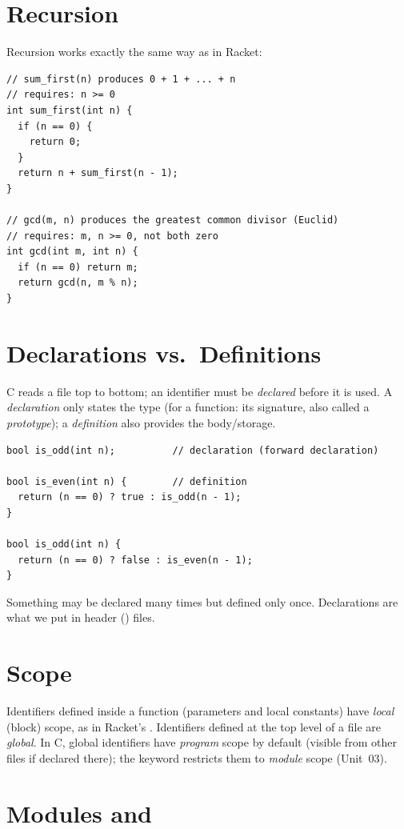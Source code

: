 \section{Recursion}

Recursion works exactly the same way as in Racket:
\begin{lstlisting}[style=c]
// sum_first(n) produces 0 + 1 + ... + n
// requires: n >= 0
int sum_first(int n) {
  if (n == 0) {
    return 0;
  }
  return n + sum_first(n - 1);
}

// gcd(m, n) produces the greatest common divisor (Euclid)
// requires: m, n >= 0, not both zero
int gcd(int m, int n) {
  if (n == 0) return m;
  return gcd(n, m % n);
}
\end{lstlisting}

\section{Declarations vs.\ Definitions}

C reads a file top to bottom; an identifier must be \emph{declared} before it is used.
A \emph{declaration} only states the type (for a function: its signature, also called a
\emph{prototype}); a \emph{definition} also provides the body/storage.
\begin{lstlisting}[style=c]
bool is_odd(int n);          // declaration (forward declaration)

bool is_even(int n) {        // definition
  return (n == 0) ? true : is_odd(n - 1);
}

bool is_odd(int n) {
  return (n == 0) ? false : is_even(n - 1);
}
\end{lstlisting}
Something may be declared many times but defined only once. Declarations are what we put in
header () files.

\section{Scope}

Identifiers defined inside a function (parameters and local constants) have \emph{local}
(block) scope, as in Racket's . Identifiers defined at the top level of a file are
\emph{global}. In C, global identifiers have \emph{program} scope by default (visible from other
files if declared there); the keyword  restricts them to \emph{module} scope
(Unit~03).

\section{Modules and }

